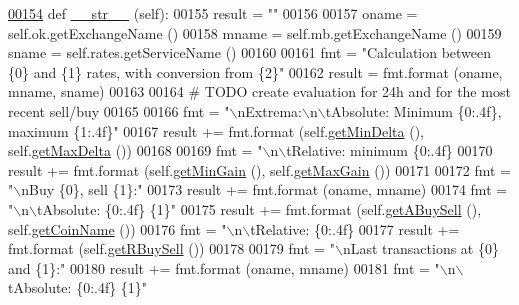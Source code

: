 \begin{DoxyCode}
\hypertarget{classexch2exch_1_1_differences.tex_l00154}{}\hyperlink{classexch2exch_1_1_differences_af2d3dc1abc5bfb7f84192e03af199c5f}{00154}     \textcolor{keyword}{def }\hyperlink{classexch2exch_1_1_differences_af2d3dc1abc5bfb7f84192e03af199c5f}{\_\_str\_\_} (self):
00155         result = \textcolor{stringliteral}{""}
00156         
00157         oname = self.ok.getExchangeName ()
00158         mname = self.mb.getExchangeName ()
00159         sname = self.rates.getServiceName ()
00160         
00161         fmt = \textcolor{stringliteral}{"Calculation between \{0\} and \{1\} rates, with conversion from \{2\}"}
00162         result = fmt.format (oname, mname, sname)
00163         
00164         \textcolor{comment}{# TODO create evaluation for 24h and for the most recent sell/buy}
00165         
00166         fmt = \textcolor{stringliteral}{"\(\backslash\)nExtrema:\(\backslash\)n\(\backslash\)tAbsolute: Minimum \{0:.4f\}, maximum \{1:.4f\}"}
00167         result += fmt.format (self.\hyperlink{classexch2exch_1_1_differences_ad2c60e37e0a390dd89be5d9388e552a4}{getMinDelta} (), self.\hyperlink{classexch2exch_1_1_differences_a577c9c2cbc470643f7bff8fc50295816}{getMaxDelta} ())
00168         
00169         fmt = \textcolor{stringliteral}{"\(\backslash\)n\(\backslash\)tRelative: minimum \{0:.4f\} %
00170         result += fmt.format (self.\hyperlink{classexch2exch_1_1_differences_a110cb3a79f744b6d3911b6669b8a0a89}{getMinGain} (), self.\hyperlink{classexch2exch_1_1_differences_a3b557469ba68c3041d6ef04dc847c77b}{getMaxGain} ())
00171         
00172         fmt = \textcolor{stringliteral}{"\(\backslash\)nBuy \{0\}, sell \{1\}:"}
00173         result += fmt.format (oname, mname)
00174         fmt = \textcolor{stringliteral}{"\(\backslash\)n\(\backslash\)tAbsolute: \{0:.4f\} \{1\}"}
00175         result += fmt.format (self.\hyperlink{classexch2exch_1_1_differences_a5b1000fb221e0726fb36a8e9a0655d84}{getABuySell} (), self.\hyperlink{classexch2exch_1_1_differences_a27c3904cedfe6f58d750591c1f7c7879}{getCoinName} ())
00176         fmt = \textcolor{stringliteral}{"\(\backslash\)n\(\backslash\)tRelative: \{0:.4f\} %
00177         result += fmt.format (self.\hyperlink{classexch2exch_1_1_differences_ae360dc9692075e21d0aafa2ff1dc23d4}{getRBuySell} ())
00178         
00179         fmt = \textcolor{stringliteral}{"\(\backslash\)nLast transactions at \{0\} and \{1\}:"}
00180         result += fmt.format (oname, mname)
00181         fmt = \textcolor{stringliteral}{"\(\backslash\)n\(\backslash\)tAbsolute: \{0:.4f\} \{1\}"}
}}
\end{DoxyCode}
